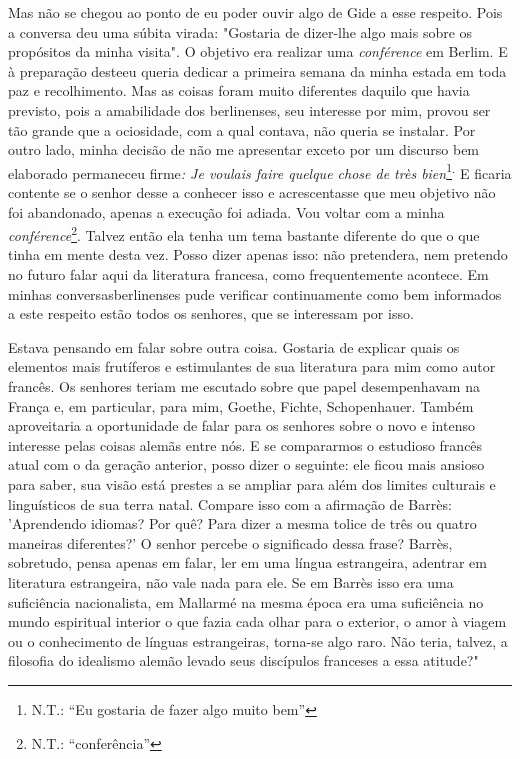 Mas não se chegou ao ponto de eu poder ouvir algo de Gide a esse
respeito. Pois a conversa deu uma súbita virada: "Gostaria de dizer-lhe
algo mais sobre os propósitos da minha visita". O objetivo era realizar
uma \emph{conférence} em Berlim. E à preparação desteeu queria dedicar a
primeira semana da minha estada em toda paz e recolhimento. Mas as
coisas foram muito diferentes daquilo que havia previsto, pois a
amabilidade dos berlinenses, seu interesse por mim, provou ser tão
grande que a ociosidade, com a qual contava, não queria se instalar. Por
outro lado, minha decisão de não me apresentar exceto por um discurso
bem elaborado permaneceu firme\emph{: Je voulais faire quelque chose de
très bien}\footnote{N.T.: ``Eu gostaria de fazer algo muito bem''}\textsuperscript{.}
E ficaria contente se o senhor desse a conhecer isso e acrescentasse que
meu objetivo não foi abandonado, apenas a execução foi adiada. Vou
voltar com a minha \emph{conférence}\footnote{N.T.: ``conferência''}.
Talvez então ela tenha um tema bastante diferente do que o que tinha em
mente desta vez. Posso dizer apenas isso: não pretendera, nem pretendo
no futuro falar aqui da literatura francesa, como frequentemente
acontece. Em minhas conversasberlinenses pude verificar continuamente
como bem informados a este respeito estão todos os senhores, que se
interessam por isso.

Estava pensando em falar sobre outra coisa. Gostaria de explicar quais
os elementos mais frutíferos e estimulantes de sua literatura para mim
como autor francês. Os senhores teriam me escutado sobre que papel
desempenhavam na França e, em particular, para mim, Goethe, Fichte,
Schopenhauer. Também aproveitaria a oportunidade de falar para os
senhores sobre o novo e intenso interesse pelas coisas alemãs entre nós.
E se compararmos o estudioso francês atual com o da geração anterior,
posso dizer o seguinte: ele ficou mais ansioso para saber, sua visão
está prestes a se ampliar para além dos limites culturais e linguísticos
de sua terra natal. Compare isso com a afirmação de Barrès: 'Aprendendo
idiomas? Por quê? Para dizer a mesma tolice de três ou quatro maneiras
diferentes?' O senhor percebe o significado dessa frase? Barrès,
sobretudo, pensa apenas em falar, ler em uma língua estrangeira,
adentrar em literatura estrangeira, não vale nada para ele. Se em Barrès
isso era uma suficiência nacionalista, em Mallarmé na mesma época era
uma suficiência no mundo espiritual interior o que fazia cada olhar para
o exterior, o amor à viagem ou o conhecimento de línguas estrangeiras,
torna-se algo raro. Não teria, talvez, a filosofia do idealismo alemão
levado seus discípulos franceses a essa atitude?"

